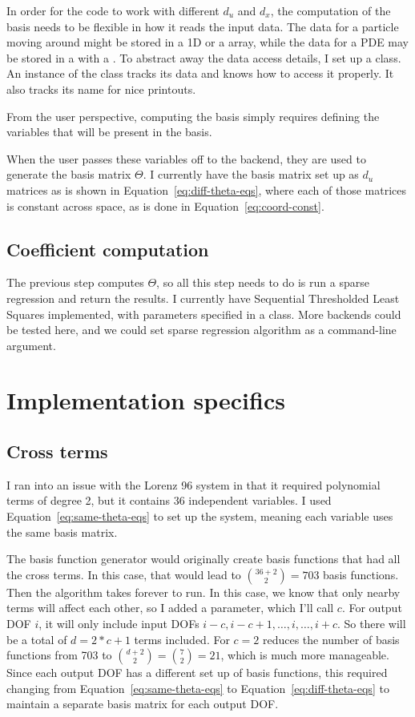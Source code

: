 \documentclass{article}
\def\lstinline#1{}%
\begin{document}
In order for the code to work with different $d_u$ and $d_x$, the computation of
the basis needs to be flexible in how it reads the input data. The data
for a particle moving around might be stored in a 1D \lstinline{Vec} or a
\lstinline{PetscScalar} array, while the data for a PDE may be stored in a
\lstinline{Vec} with a \lstinline{DMDA}. To abstract away the data access
details, I set up a \lstinline{Variable} class. An instance of the class tracks
its data and knows how to access it properly. It also tracks its name for nice
printouts.

From the user perspective, computing the basis simply requires defining the variables
that will be present in the basis.

When the user passes these variables off to the backend, they are used to
generate the basis matrix $\Theta$.
I currently have the basis matrix set up as $d_u$ matrices as is shown in Equation~\ref{eq:diff-theta-eqs}, where
each of those matrices is constant across space, as is done in Equation~\ref{eq:coord-const}.


\subsection{Coefficient computation}

The previous step computes $\Theta$, so all this step needs to do is run a
sparse regression and return the results. I currently have Sequential
Thresholded Least Squares implemented, with parameters specified in a
\lstinline{SparseReg} class. More backends could be tested here, and we could
set sparse regression algorithm as a command-line argument.

\section{Implementation specifics}

\subsection{Cross terms}
I ran into an issue with the Lorenz 96 system in that it required polynomial
terms of degree 2, but it contains 36 independent variables. I used
Equation~\ref{eq:same-theta-eqs} to set up the system, meaning each variable
uses the same basis matrix.

The basis function generator would originally create basis functions that had
all the cross terms. In this case, that would lead to $\binom{36 + 2}{2} = 703$
basis functions. Then the algorithm takes forever to run. In this case, we know
that only nearby terms will affect each other, so I added a
\lstinline{cross_term_range} parameter, which I'll call $c$. For output DOF $i$,
it will only include input DOFs $i-c,i-c+1,\hdots,i,\hdots,i+c$. So there will
be a total of $d = 2*c+1$ terms included. For $c=2$ reduces the number of basis
functions from 703 to $\binom{d+2}{2} = \binom{7}{2} = 21$, which is much more
manageable. Since each output DOF has a different set up of basis functions,
this required changing from Equation~\ref{eq:same-theta-eqs} to
Equation~\ref{eq:diff-theta-eqs} to maintain a separate basis matrix for each
output DOF.
\end{document}
